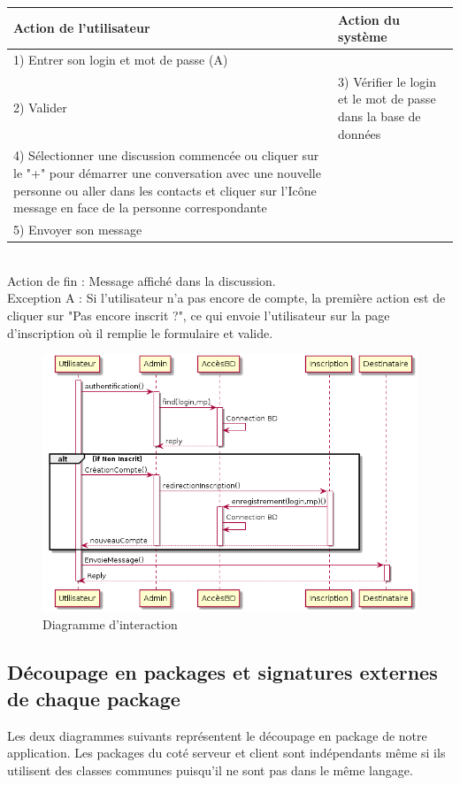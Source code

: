 	\begin{tabular}{|p{7cm}|p{7cm}|}
		\hline
		Action de l'utilisateur & Action du système\tabularnewline
		\hline

		\hline
		1) Entrer son login et mot de passe (A)  & \tabularnewline

		\hline
		2) Valider  & 3) Vérifier le login et le mot de passe dans la base de données\tabularnewline

		\hline
		4) Sélectionner une discussion commencée ou cliquer sur le "+" pour	démarrer une conversation avec une nouvelle personne ou aller dans les contacts et cliquer sur l’Icône message en face de la personne correspondante & \tabularnewline

		\hline
		5) Envoyer son message  & \tabularnewline
		\hline
	\end{tabular}

~\\

	Action de fin  : Message affiché dans la discussion. \\

	Exception A : Si l'utilisateur n'a pas encore de compte, la première action est de cliquer sur "Pas encore inscrit ?", ce qui envoie l'utilisateur sur la page d'inscription où il remplie le formulaire et valide.

	\begin{figure}[H]
		\centerline{\includegraphics[width=12.5cm]{img/interaction.png}}
		\caption{Diagramme d’interaction}
	\end{figure}

	\newpage

	\subsection{Découpage en packages et signatures externes de chaque package}
	Les deux diagrammes suivants représentent le découpage en package de notre application.
	Les packages du coté serveur et client sont indépendants même si ils utilisent des classes communes puisqu'il ne sont pas dans le même langage.
	
